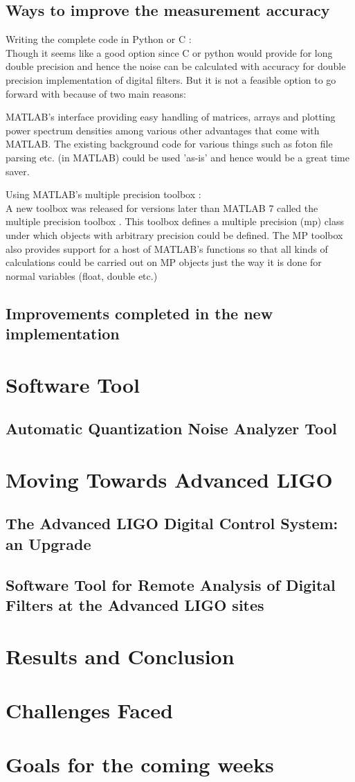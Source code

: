 \documentclass[colorlinks=true,pdfstartview=FitV,linkcolor=blue,
            citecolor=red,urlcolor=magenta]{ligodoc}
\begin{document}
	
	\subsection{Ways to improve the measurement accuracy}
		\begin{enumerate}
			\list Writing the complete code in Python or C  : \\ Though it seems like a good option since C or python would provide for long double precision \cite{long_double} and hence the noise can be calculated with accuracy for double precision implementation of digital filters. But it is not a feasible option to go forward with because of two main reasons:
				\begin{enumerate}
					\list MATLAB's interface providing easy handling of matrices, arrays and plotting power spectrum densities among various other advantages that come with MATLAB.
					\list The existing background code for various things such as foton file parsing etc. (in MATLAB) could be used 'as-is' and hence would be a great time saver. 
				\end{enumerate}
			\list Using MATLAB's multiple precision toolbox : \\ A new toolbox was released for versions later than MATLAB 7 called the multiple precision toolbox \cite{MP}. This toolbox defines a multiple precision (mp) class under which objects with arbitrary precision could be defined. The MP toolbox also provides support for a host of MATLAB's functions so that all kinds of calculations could be carried out on MP objects just the way it is done for normal variables (float, double etc.)
		\end{enumerate}
	\subsection{Improvements completed in the new implementation}
\section{Software Tool}
	\subsection{Automatic Quantization Noise Analyzer Tool}
\section{Moving Towards Advanced LIGO}
	\subsection{The Advanced LIGO Digital Control System: an Upgrade}
	\subsection{Software Tool for Remote Analysis of Digital Filters at the Advanced LIGO sites}
	
\section{Results and Conclusion}
\section{Challenges Faced}
\section{Goals for the coming weeks}
\end{document}
